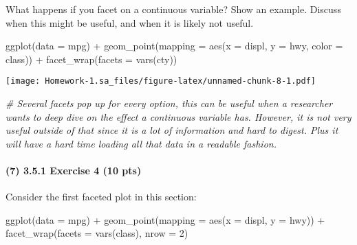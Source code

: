 \documentclass[
]{article}
\newenvironment{Shaded}{\begin{snugshade}}{\end{snugshade}}
\newcommand{\AttributeTok}[1]{\textcolor[rgb]{0.77,0.63,0.00}{#1}}
\newcommand{\CommentTok}[1]{\textcolor[rgb]{0.56,0.35,0.01}{\textit{#1}}}
\newcommand{\DecValTok}[1]{\textcolor[rgb]{0.00,0.00,0.81}{#1}}
\newcommand{\FunctionTok}[1]{\textcolor[rgb]{0.00,0.00,0.00}{#1}}
\newcommand{\NormalTok}[1]{#1}
\newcommand{\SpecialCharTok}[1]{\textcolor[rgb]{0.00,0.00,0.00}{#1}}
\begin{document}
What happens if you facet on a continuous variable? Show an example.
Discuss when this might be useful, and when it is likely not useful.

\begin{Shaded}
\begin{Highlighting}[]
\FunctionTok{ggplot}\NormalTok{(}\AttributeTok{data =}\NormalTok{ mpg) }\SpecialCharTok{+} 
  \FunctionTok{geom\_point}\NormalTok{(}\AttributeTok{mapping =} \FunctionTok{aes}\NormalTok{(}\AttributeTok{x =}\NormalTok{ displ, }\AttributeTok{y =}\NormalTok{ hwy, }\AttributeTok{color =}\NormalTok{ class)) }\SpecialCharTok{+}
  \FunctionTok{facet\_wrap}\NormalTok{(}\AttributeTok{facets =} \FunctionTok{vars}\NormalTok{(cty))}
\end{Highlighting}
\end{Shaded}

\texttt{[image: Homework-1.sa\_files/figure-latex/unnamed-chunk-8-1.pdf]}

\begin{Shaded}
\begin{Highlighting}[]
\CommentTok{\# Several facets pop up for every option, this can be useful when a researcher wants to   deep dive on the effect a continuous variable has. However, it is not very useful outside of that since it is a lot of information and hard to digest. Plus it will have a hard time loading all that data in a readable fashion.}
\end{Highlighting}
\end{Shaded}

\hypertarget{exercise-4-10-pts-1}{%
\paragraph{(7) 3.5.1 Exercise 4 (10 pts)}\label{exercise-4-10-pts-1}}

Consider the first faceted plot in this section:

\begin{Shaded}
\begin{Highlighting}[]
\FunctionTok{ggplot}\NormalTok{(}\AttributeTok{data =}\NormalTok{ mpg) }\SpecialCharTok{+} 
  \FunctionTok{geom\_point}\NormalTok{(}\AttributeTok{mapping =} \FunctionTok{aes}\NormalTok{(}\AttributeTok{x =}\NormalTok{ displ, }\AttributeTok{y =}\NormalTok{ hwy)) }\SpecialCharTok{+} 
  \FunctionTok{facet\_wrap}\NormalTok{(}\AttributeTok{facets =} \FunctionTok{vars}\NormalTok{(class), }\AttributeTok{nrow =} \DecValTok{2}\NormalTok{)}
\end{Highlighting}
\end{Shaded}
\end{document}
